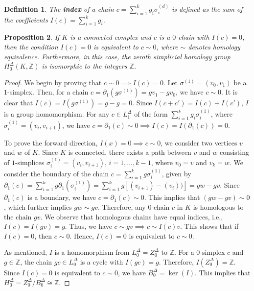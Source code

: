\documentclass{amsart}
\newtheorem{definition}{Definition}[section]
\newtheorem{proposition}[definition]{Proposition}
\begin{document}
\begin{definition}
The \textbf{index} of a chain $c = \sum_{i=1}^{k} g_i \sigma_i^{(d)}$ is defined as the sum of the coefficients $I(c) = \sum_{i=1}^{k} g_i$.
\end{definition}

\begin{proposition}
\label{decomposition}
If $K$ is a connected complex and $c$ is a $0$-chain with $I(c) = 0$, then the condition $I(c) = 0$ is equivalent to $c \sim 0$, where $\sim$ denotes homology equivalence. Furthermore, in this case, the zeroth simplicial homology group $H^\Delta_0(K,\mathbb{Z})$ is isomorphic to the integers $\mathbb{Z}$.
\end{proposition}

\begin{proof}
We begin by proving that $c \sim 0 \implies I(c) = 0$. Let $\sigma^{(1)} = (v_0,v_1)$ be a $1$-simplex. Then, for a chain $c = \partial_1(g\sigma^{(1)}) = gv_1-gv_0$, we have $c \sim 0$. It is clear that $I(c) = I(g\sigma^{(1)}) = g-g = 0$. Since $I(c+c') = I(c) + I(c')$, $I$ is a group homomorphism. For any $c \in L^\Delta_1$ of the form $\sum_{i=1}^{k} g_i \sigma_i^{(1)}$, where $\sigma_i^{(1)} = (v_i,v_{i+1})$, we have $c = \partial_1(c) \sim 0 \implies I(c) = I(\partial_1(c)) = 0$.

To prove the forward direction, $I(x) = 0 \implies c \sim 0$, we consider two vertices $v$ and $w$ of $K$. Since $K$ is connected, there exists a path between $v$ and $w$ consisting of $1$-simplices $\sigma_i^{(1)} = (v_i,v_{i+1})$, $i=1,\ldots,k-1$, where $v_0 = v$ and $v_k = w$. We consider the boundary of the chain $c = \sum_{i=1}^{k} g \sigma_i^{(1)}$, given by $\partial_1(c) = \sum_{i=1}^{k}g \partial_1(\sigma_i^{(1)}) = \sum_{i=1}^{k}g [(v_{i+1}) - (v_i))] = gw - gv$. Since $\partial_1(c)$ is a boundary, we have $c = \partial_1(c) \sim 0$. This implies that $(gw-gv) \sim 0$, which further implies $gw \sim gv$. Therefore, any $0$-chain $c$ in $K$ is homologous to the chain $gv$. We observe that homologous chains have equal indices, i.e., $I(c) = I(gv) = g$. Thus, we have $c \sim gv \implies c \sim I(c)v$. This shows that if $I(c) = 0$, then $c \sim 0$. Hence, $I(c) = 0$ is equivalent to $c \sim 0$.

As mentioned, $I$ is a homomorphism from $L^\Delta_0 = Z^\Delta_0$ to $\mathbb{Z}$. For a $0$-simplex $c$ and $g \in \mathbb{Z}$, the chain $gc \in L^\Delta_0$ is a cycle with $I(gc) = g$. Therefore, $I(Z^\Delta_0) = \mathbb{Z}$. Since $I(c) = 0$ is equivalent to $c \sim 0$, we have $B^\Delta_0 = \ker(I)$. This implies that $H^\Delta_0 = Z^\Delta_0/B^\Delta_0 \cong \mathbb{Z}$.
\end{proof}
\end{document}
